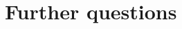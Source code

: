 \documentclass[10pt]{beamer}
\newcommand{\Sym}{\mathcal{S}}
\newcommand{\sgn}{\text{sgn}}
\newcommand{\bas}{\mathbf{e}}
\newcommand{\id}{\text{id}}
\begin{document}
%				
%				
%				
%		
%		
%		
	
\section{Further questions}
\end{document}
